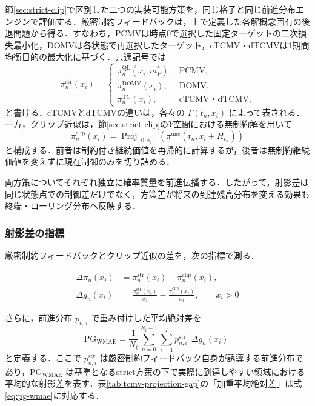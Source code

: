 \documentclass[10pt,a4paper]{article}
\theoremstyle{plain}
\theoremstyle{definition}
\DeclareMathOperator{\Proj}{Proj}
\begin{document}
節\ref{sec:strict-clip}で区別した二つの実装可能方策を，同じ格子と同じ前進分布エンジンで評価する．厳密制約フィードバックは，上で定義した各解概念固有の後退問題から得る．すなわち，PCMVは時点0で選択した固定ターゲットの二次損失最小化，DOMVは各状態で再選択したターゲット，cTCMV・dTCMVは1期間均衡目的の最大化に基づく．共通記号では
\begin{equation}
  \pi_n^{\mathrm{str}}(x_i)
  =
  \begin{cases}
    \pi_n^{\mathrm{QL}}(x_i;m_P^*), & \text{PCMV},\\
    \pi_n^{\mathrm{DOMV}}(x_i), & \text{DOMV},\\
    \pi_n^{\mathrm{TC}}(x_i), & \text{cTCMV・dTCMV},
  \end{cases}
  \label{eq:pi-str-def}
\end{equation}
と書ける．cTCMVとdTCMVの違いは，各々の $\Gamma(t_n,x_i)$ によって表される．一方，クリップ近似は，節\ref{sec:strict-clip}の$Y$空間における無制約解を用いて
\begin{equation}
  \pi_n^{\mathrm{clip}}(x_i)
  =\Proj_{[0,x_i]}\!\left(\pi^{\mathrm{unc}}(t_n,x_i+H_{t_n})\right)
  \label{eq:pi-clip-def}
\end{equation}
と構成する．前者は制約付き継続価値を再帰的に計算するが，後者は無制約継続価値を変えずに現在制御のみを切り詰める．

両方策についてそれぞれ独立に確率質量を前進伝播する．したがって，射影差は同じ状態点での制御差だけでなく，方策差が将来の到達残高分布を変える効果も終端・ローリング分布へ反映する．

\subsubsection{射影差の指標}

厳密制約フィードバックとクリップ近似の差を，次の指標で測る．

\begin{align}
  \Delta\pi_n(x_i)
  &=\pi_n^{\mathrm{str}}(x_i)-\pi_n^{\mathrm{clip}}(x_i),
  \label{eq:delta-pi}\\
  \Delta g_n(x_i)
  &=\frac{\pi_n^{\mathrm{str}}(x_i)}{x_i}
  -\frac{\pi_n^{\mathrm{clip}}(x_i)}{x_i},
  \qquad x_i>0
  \label{eq:delta-g}
\end{align}

さらに，前進分布 $p_{n,i}$ で重み付けした平均絶対差を
\begin{equation}
  \mathrm{PG}_{\mathrm{WMAE}}
  =\frac{1}{N_t}
  \sum_{n=0}^{N_t-1}\sum_{i=1}^{I}
  p_{n,i}^{\mathrm{str}}\,|\Delta g_n(x_i)|
  \label{eq:pg-wmae}
\end{equation}
と定義する．ここで $p_{n,i}^{\mathrm{str}}$ は厳密制約フィードバック自身が誘導する前進分布であり，$\mathrm{PG}_{\mathrm{WMAE}}$ は基準となるstrict方策の下で実際に到達しやすい領域における平均的な射影差を表す．表\ref{tab:tcmv-projection-gap}の「加重平均絶対差」は式\eqref{eq:pg-wmae}に対応する．
\end{document}
